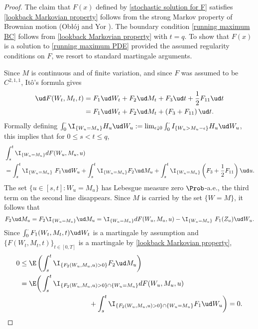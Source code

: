 \documentclass[11pt]{article}
\begin{document}
\begin{proof}

The claim that $F(x)$ defined by \eqref{stochastic solution for F} satisfies \eqref{lookback Markovian property} follows from the strong Markov property of Brownian motion (Ob\l\'oj and Yor \cite{Obloj-Yor}). The boundary condition \eqref{running maximum BC} follows from \eqref{lookback Markovian property} with $t=q$. To show that $F(x)$ is a solution to \eqref{running maximum PDE} provided the assumed regularity conditions on $F$, we resort to standard martingale arguments.

Since $M$ is continuous and of finite variation, and since $F$ was assumed to be $C^{2,1,1}$, It\^o's formula gives
\begin{align}
\ud F(W_t, M_t, t) &= F_1 \ud W_t + F_2 \ud M_t + F_3 \ud t + \frac{1}{2} F_{11} \ud t \nonumber \\ 
& = F_1 \ud W_t + F_2 \ud M_t + \left( F_3 + F_{11} \right) \ud t.\label{lookback solution proof eqn 2} 
\end{align}
Formally defining $\int_0^\cdot \I_{\{ W_u = M_u \}} H_u \ud W_u := \lim_{\epsilon \downarrow 0} \int_0^\cdot I_{\{ W_u > M_u - \epsilon \}} H_u \ud W_u$, this implies that for $0 \leq s < t \leq q$,
\begin{align*}
&\int_s^t \I_{\{W_u = M_u\}} dF(W_u, M_u, u) \\
&= \int_s^t  \I_{\{W_u = M_u\}} \ F_1 \ud W_u + \int_s^t \I_{\{W_u = M_u\}} F_2 \ud M_u + \int_s^t \I_{\{W_u = M_u\}} \left( F_3 + \frac{1}{2} F_{11} \right) \ud u. 
\end{align*}
The set $\{ u \in [s,t] : W_u = M_u \}$ has Lebesgue measure zero $\Prob$-a.e., the third term on the
second line disappears. Since $M$ is carried by the set $\{ W = M \}$, it follows that
$$
F_2 \ud M_u = F_2 \I_{\{ W_u = M_u \}} \ud M_u = \I_{\{ W_u = M_u \}} dF(W_u, M_u, u) - \I_{\{ W_u = M_u \}} \ F_1(Z_u) \ud W_u. 
$$
Since $\int_0^\cdot F_1(W_t, M_t, t) \ud W_t$ is a martingale by assumption and $\{ F(W_t, M_t, t) \}_{t \in [0,T]}$ is a martingale by
\eqref{lookback Markovian property},
\begin{align*}
0 &\leq \E\left( \int_s^t \I_{\{ F_2(W_u, M_u, u) > 0 \}} F_2 \ud M_u \right) \\
&= \E \bigg{(} \int_s^t \I_{ \{ F_2(W_u, M_u, u) > 0 \} \cap \{ W_u = M_u \} } dF(W_u, M_u, u) \\
& \hspace{100pt} + \int_s^t \I_{ \{F_2(W_u, M_u, u) > 0 \} \cap \{ W_u = M_u \} } F_1 \ud W_u \bigg{)} = 0.

\end{align*}
\end{proof}
\end{document}
